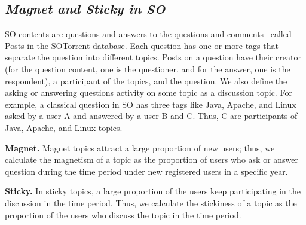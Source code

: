 \documentclass[english,preprint,JIP,technote]{ipsj}
\begin{document}




\subsection*{\textit{\textbf{Magnet and Sticky in SO}}}

SO contents are questions and answers to the questions and comments~\cite{liu2018mining} called Posts in the  SOTorrent database. Each question has one or more tags that separate the question into different topics. Posts on a question have their creator (for the question content, one is the questioner, and for the answer, one is the respondent), a participant of the topics, and the question. We also define the asking or answering questions activity on some topic as a discussion topic. For example, a classical question in SO has three tags like Java, Apache, and Linux asked by a user A and answered by a user B and C. Thus, C are participants of Java, Apache, and Linux-topics.

\noindent
\textbf{Magnet.} Magnet topics attract a large proportion of new users; thus, we calculate the magnetism of a topic as the proportion of users who ask or answer question during the time period under new registered users in a specific year.

\noindent
\textbf{Sticky.} In sticky topics, a large proportion of the users keep participating in the discussion in the time period. Thus, we calculate the stickiness of a topic as the proportion of the users who discuss the topic in the time period.
\end{document}
